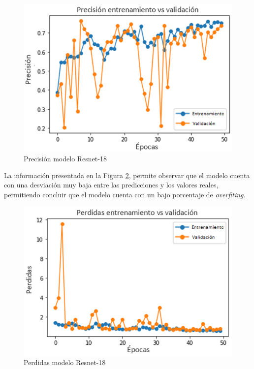 \begin{figure}[ht]
	\centering
	\includegraphics[scale=0.55]{Figs/109.png}
	\caption{Precisión modelo Resnet-18}
	\label{fig:preci_RESNET18}
\end{figure}

La información presentada en la Figura \ref{fig:perdda_RESNET18}, permite observar que el modelo cuenta con una desviación muy baja entre las predicciones y los valores reales, permitiendo concluir que el modelo cuenta con un bajo porcentaje de \textit{overfiting}. 

\begin{figure}[ht]
	\centering
	\includegraphics[scale=0.55]{Figs/110.png}
	\caption{Perdidas modelo Resnet-18}
	\label{fig:perdda_RESNET18}
\end{figure}

